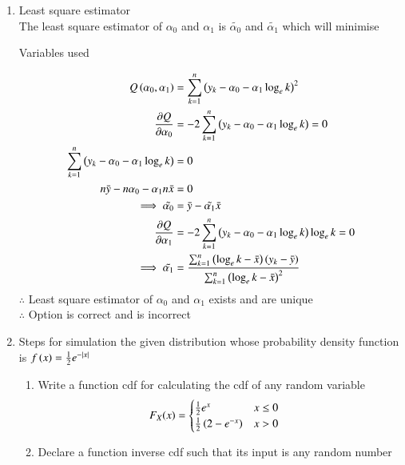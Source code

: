 \documentclass[journal,12pt,onecolumn]{IEEEtran}
\theoremstyle{remark}
\begin{document}
\begin{enumerate}
\begin{enumerate}
\item Least square estimator\\
The least square estimator of $\alpha_{0}$ and $\alpha_{1}$ is $\tilde{\alpha_{0}}$ and $\tilde{\alpha_{1}}$ which will minimise
\begin{table}[!htb]
	
	\caption{Variables used}
	\label{table_gate23_st_26}
\end{table}
\begin{align}
	Q\brak{\alpha_{0},\alpha_{1}} &=  \sum_{k = 1}^{n} \brak{y_{k}-\alpha_{0}-\alpha_{1} \log_{e}k}^2\\
\frac{\partial Q}{\partial \alpha_{0}} &= -2 \sum_{k = 1}^{n} \brak{y_{k}-\alpha_{0}-\alpha_{1} \log_{e}k} = 0\\
	\sum_{k = 1}^{n} \brak{y_{k}-\alpha_{0}-\alpha_{1} \log_{e}k} &= 0\\
	n\bar{y} - n\alpha_{0} - \alpha_{1}n\bar{x} &= 0 \\%
	\implies \tilde{\alpha_{0}} &= \bar{y} - \tilde{\alpha_{1}}\bar{x}\\
	\frac{\partial Q}{\partial \alpha_{1}} &= -2 \sum_{k = 1}^{n} \brak{y_{k}-\alpha_{0}-\alpha_{1} \log_{e}k}\log_{e}k = 0\\
	\implies \tilde{\alpha_{1}} &= \frac{\sum_{k = 1}^{n}\brak{\log_{e}k-\bar{x}}\brak{y_{k}-\bar{y}}}{\sum_{k = 1}^{n}\brak{\log_{e}k-\bar{x}}^2}
\end{align}
$\therefore$ Least square estimator of $\alpha_{0}$ and $\alpha_{1}$ exists and are unique\\
$\therefore$ Option  is correct and  is incorrect\\
\item Steps for simulation the given distribution whose 
	probability density function is $ f\left(x\right) = \frac{1}{2} e^{-|x|}$
\begin{enumerate}
\item Write a function cdf for calculating the cdf of any random variable\\
	\begin{align}
  F_X(x) &= 
  \begin{cases}
	  \frac{1}{2} e^{x} & x \le 0
  \\
	  \frac{1}{2} \left(2-e^{-x}\right) &  x > 0
  \end{cases}
  \end{align}
\item Declare a function inverse cdf  such that its input is any random number 

\end{enumerate}
\end{enumerate}
\end{enumerate}
\end{document}
